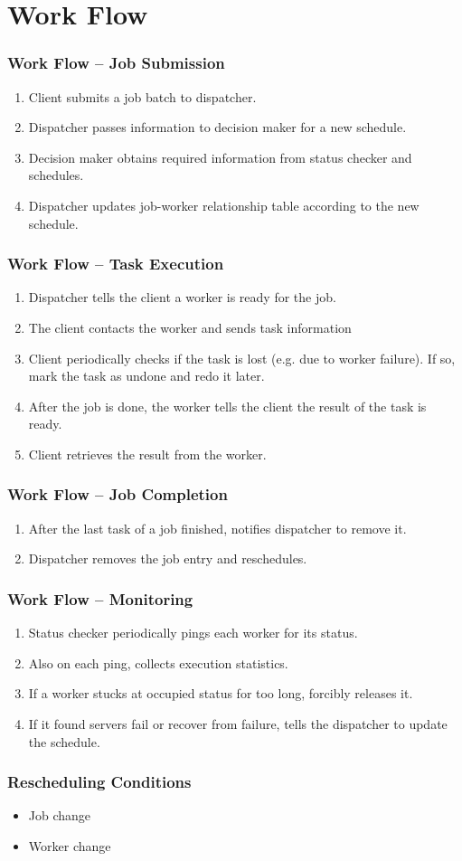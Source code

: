 \section{Work Flow}
\begin{frame}
  \frametitle{Work Flow -- Job Submission}
  \begin{enumerate}
    \item Client submits a job batch to dispatcher.
    \item Dispatcher passes information to decision maker for a new
      schedule.
    \item Decision maker obtains required information from status
      checker and schedules.
    \item Dispatcher updates job-worker relationship table according to
      the new schedule.
  \end{enumerate}
\end{frame}
\begin{frame}
  \frametitle{Work Flow -- Task Execution}
  \begin{enumerate}
    \item Dispatcher tells the client a worker is ready for the job.
    \item The client contacts the worker and sends task information
    \item Client periodically checks if the task is lost (e.g. due to
      worker failure).  If so, mark the task as undone and redo it
      later.
    \item After the job is done, the worker tells the client the
      result of the task is ready.
    \item Client retrieves the result from the worker.
  \end{enumerate}
\end{frame}
\begin{frame}
  \frametitle{Work Flow -- Job Completion}
  \begin{enumerate}
    \item After the last task of a job finished, notifies dispatcher to
      remove it.
    \item Dispatcher removes the job entry and reschedules.
  \end{enumerate}
\end{frame}
\begin{frame}
  \frametitle{Work Flow -- Monitoring}
  \begin{enumerate}
    \item Status checker periodically pings each worker for its status.
    \item Also on each ping, collects execution statistics.
    \item If a worker stucks at occupied status for too long, forcibly
      releases it.
    \item If it found servers fail or recover from failure, tells the
      dispatcher to update the schedule.
  \end{enumerate}
\end{frame}
\begin{frame}
  \frametitle{Rescheduling Conditions}
  \begin{itemize}
    \item Job change
    \item Worker change
  \end{itemize}
\end{frame}
